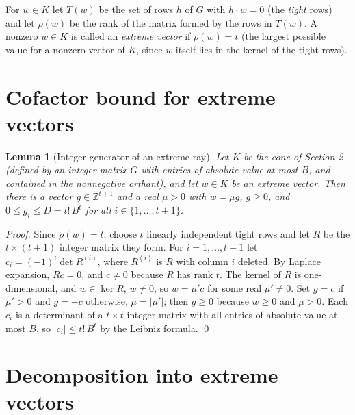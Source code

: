 \documentclass[11pt]{article}
\newtheorem{lemma}{Lemma}
\newcommand{\Z}{\mathbb Z}\newcommand{\R}{\mathbb R}\newcommand{\Q}{\mathbb Q}
\begin{document}
For $w\in K$ let $T(w)$ be the set of rows $h$ of $G$ with $h\cdot w=0$ (the \emph{tight} rows) and let $\rho(w)$ be the rank of the matrix formed by the rows in $T(w)$. A nonzero $w\in K$ is called an \emph{extreme vector} if $\rho(w)=t$ (the largest possible value for a nonzero vector of $K$, since $w$ itself lies in the kernel of the tight rows).

\section{Cofactor bound for extreme vectors}

\begin{lemma}[Integer generator of an extreme ray]\label{lem:cofactor}
Let $K$ be the cone of Section 2 (defined by an integer matrix $G$ with entries of absolute value at most $B$, and contained in the nonnegative orthant), and let $w\in K$ be an extreme vector. Then there is a vector $g\in\Z^{t+1}$ and a real $\mu>0$ with $w=\mu g$, $g\ge 0$, and $0\le g_i\le D=t!\,B^t$ for all $i\in\{1,\dots,t+1\}$.
\end{lemma}
\begin{proof}
Since $\rho(w)=t$, choose $t$ linearly independent tight rows and let $R$ be the $t\times(t+1)$ integer matrix they form. For $i=1,\dots,t+1$ let $c_i=(-1)^{i}\det R^{(i)}$, where $R^{(i)}$ is $R$ with column $i$ deleted. By Laplace expansion, $R c=0$, and $c\neq 0$ because $R$ has rank $t$. The kernel of $R$ is one-dimensional, and $w\in\ker R$, $w\ne 0$, so $w=\mu' c$ for some real $\mu'\ne0$. Set $g=c$ if $\mu'>0$ and $g=-c$ otherwise, $\mu=|\mu'|$; then $g\ge0$ because $w\ge0$ and $\mu>0$. Each $c_i$ is a determinant of a $t\times t$ integer matrix with all entries of absolute value at most $B$, so $|c_i|\le t!\,B^t$ by the Leibniz formula. \qed
\end{proof}

\section{Decomposition into extreme vectors}
\end{document}
